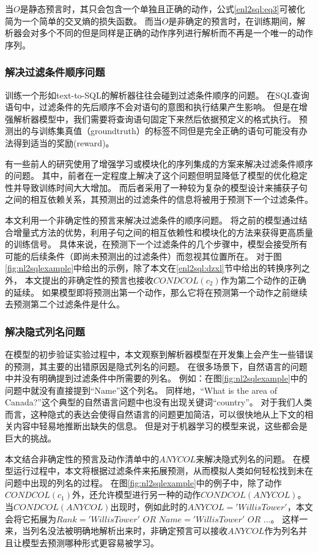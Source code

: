 当$O$是静态预言时，其只会包含一个单独且正确的动作，公式\ref{enl2sql:eq3}可被化简为一个简单的交叉熵的损失函数。
而当$O$是非确定的预言时，在训练期间，解析器会对多个不同的但是同样是正确的动作序列进行解析而不再是一个唯一的动作序列。

\subsubsection{解决过滤条件顺序问题}
\label{enl2sql:om}

训练一个形如text-to-SQL的解析器往往会碰到过滤条件顺序的问题。
在SQL查询语句中，过滤条件的先后顺序不会对语句的意图和执行结果产生影响。
但是在增强解析器模型中，我们需要将查询语句固定下来然后依据预定义的格式执行。
预测出的与训练集真值（groundtruth）的标签不同但是完全正确的语句可能没有办法得到适当的奖励(reward)。

有一些前人的研究使用了增强学习\cite{zhong2017seq2sql}或模块化的序列集成\cite{xu2017sqlnet}的方案来解决过滤条件顺序的问题。
其中，前者在一定程度上解决了这个问题但明显降低了模型的优化稳定性并导致训练时间大大增加。
而后者采用了一种较为复杂的模型设计来捕获子句之间的相互依赖关系，其预测出的过滤条件的信息将被用于预测下一个过滤条件。

本文利用一个非确定性的预言来解决过滤条件的顺序问题。
将之前的模型通过结合增量式方法的优势，利用子句之间的相互依赖性和模块化的方法来获得更高质量的训练信号。
具体来说，在预测下一个过滤条件的几个步骤中，模型会接受所有可能的后续条件（即尚未预测出的过滤条件）而忽视其位置所在。
对于图\ref{fig:nl2sqlexample}中给出的示例，除了本文在\ref{enl2sql:dzxl}节中给出的转换序列之外，
本文提出的非确定性的预言也接收$CONDCOL(c_2)$作为第二个动作的正确的延续。
如果模型即将预测出第一个动作，那么它将在预测第一个动作之前继续去预测第二个过滤条件是什么。

\subsubsection{解决隐式列名问题}
\label{enl2sql:icn}
在模型的初步验证实验过程中，本文观察到解析器模型在开发集上会产生一些错误的预测，其主要的出错原因是隐式列名的问题。
在很多场景下，自然语言的问题中并没有明确提到过滤条件中所需要的列名。
例如：在图\ref{fig:nl2sqlexample}中的问题中就没有直接提到“Name”这个列名。
同样地，“What is the area of Canada?”这个典型的自然语言问题中也没有出现关键词“country”。
对于我们人类而言，这种隐式的表达会使得自然语言的问题更加简洁，可以很快地从上下文的相关内容中轻易地推断出缺失的信息。
但是对于机器学习的模型来说，这些都会是巨大的挑战。

本文结合非确定性的预言及动作清单中的$ANYCOL$来解决隐式列名的问题。
在模型运行过程中，本文将根据过滤条件来拓展预测，从而模拟人类如何轻松找到未在问题中出现的列名的过程。
在图\ref{fig:nl2sqlexample}中的例子中，除了动作$CONDCOL(c_1)$外，还允许模型进行另一种的动作$CONDCOL(ANYCOL)$。
当$CONDCOL(ANYCOL)$出现时，例如此时的$ANYCOL='Willis Tower'$，本文会将它拓展为$Rank='Willis Tower'$ $OR$ $Name='Willis Tower'$ $OR$ $...$。
这样一来，当列名没法被明确地解析出来时，非确定预言可以接收$ANYCOL$作为列名并且让模型去预测哪种形式更容易被学习。


